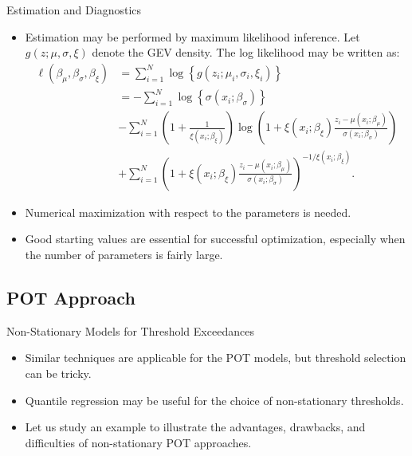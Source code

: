 \documentclass[10pt, hyperref={colorlinks = true,linkcolor = blue}]{beamer}
\begin{document}
{{{\begin{frame}{Estimation and Diagnostics}
\begin{itemize}
    \item Estimation may be performed by maximum likelihood inference. Let \(g(z; \mu, \sigma, \xi)\) denote the GEV density. The log likelihood may be written as:
   \begin{align*}
    \ell(\beta_\mu, \beta_\sigma, \beta_\xi) &= \sum_{i=1}^{N} \log \left\{ g(z_i; \mu_i, \sigma_i, \xi_i) \right\} \\
    &= -\sum_{i=1}^{N} \log \left\{ \sigma(x_i; \beta_\sigma) \right\}  \\
  & - \sum_{i=1}^{N} \left( 1 + \frac{1}{\xi(x_i; \beta_\xi)} \right) \log \left( 1 + \xi(x_i; \beta_\xi) \frac{z_i - \mu(x_i; \beta_\mu)}{\sigma(x_i; \beta_\sigma)} \right) \\
  & + \sum_{i=1}^{N} \left( 1 + \xi(x_i; \beta_\xi) \frac{z_i - \mu(x_i; \beta_\mu)}{\sigma(x_i; \beta_\sigma)} \right)^{-1/\xi(x_i; \beta_\xi)} .
   \end{align*}
    \item Numerical maximization with respect to the parameters is needed.
    \item Good starting values are essential for successful optimization, especially when the number of parameters is fairly large.
\end{itemize}

\end{frame}





}

{\subsection{POT Approach}
\begin{frame}{Non-Stationary Models for Threshold Exceedances}
\begin{itemize}
    \item Similar techniques are applicable for the POT  models, but threshold selection can be tricky.
    \item Quantile regression may be useful for the choice of non-stationary thresholds.
    \item Let us study an example to illustrate the advantages, drawbacks, and difficulties of non-stationary POT approaches.
\end{itemize}

\end{frame}


}}}
\end{document}
